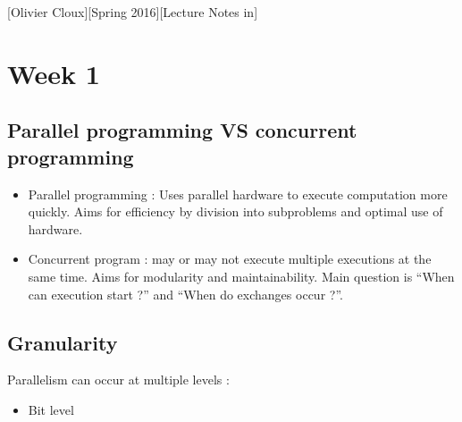 \documentclass[12pt,a4paper]{article}
\begin{document}
[Olivier Cloux][Spring 2016][Lecture Notes in]
\tableofcontents
{}
\section{Week 1}
\subsection{Parallel programming VS concurrent programming}
\begin{itemize}
    \item     Parallel programming : Uses parallel hardware to execute computation more quickly. Aims for efficiency by division into subproblems and optimal use of hardware.
    \item     Concurrent program : may or may not execute multiple executions at the same time. Aims for modularity and maintainability. Main question is ``When can execution start ?'' and ``When do exchanges occur ?''.
\end{itemize}
\subsection{Granularity}
Parallelism can occur at multiple levels :
\begin{itemize}
    \item     Bit level
\end{itemize}
\end{document}
